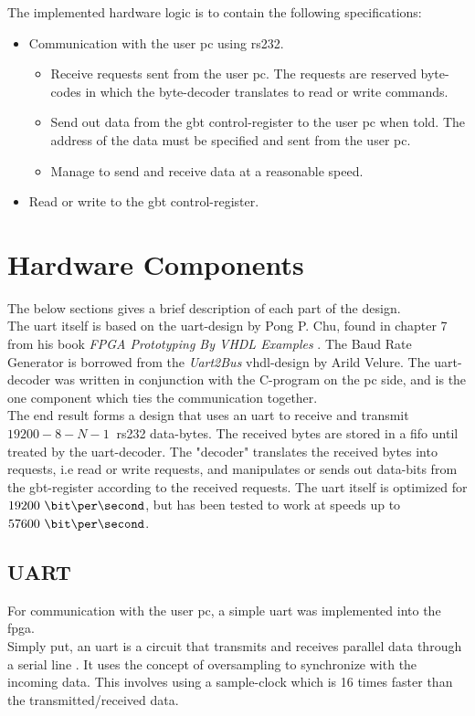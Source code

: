 \documentclass[main.tex]{subfiles}
\begin{document}
The implemented hardware logic is to contain the following specifications:\\
\begin{itemize} \setlength{\itemsep}{10pt}
\item Communication with the user \acrshort{pc} using \acrshort{rs232}.
  \begin{itemize}
  \item Receive requests sent from the user \acrshort{pc}. The requests are reserved byte-codes in which the byte-decoder translates to read or write commands. 
  \item Send out data from the \gls{gbt} control-register to the user \acrshort{pc} when told. The address of the data must be specified and sent from the user \acrshort{pc}.
  \item Manage to send and receive data at a reasonable speed. 
  \end{itemize}
\item Read or write to the \gls{gbt} control-register.
\end{itemize}

\section{Hardware Components}

The below sections gives a brief description of each part of the design.\\
The \gls{uart} itself is based on the \gls{uart}-design by Pong P. Chu, found in chapter 7 from his book \textit{FPGA Prototyping By VHDL Examples} \cite{chu08}. The Baud Rate Generator is borrowed from the \textit{Uart2Bus} \acrshort{vhdl}-design by Arild Velure. The \gls{uart}-decoder was written in conjunction with the C-program on the \acrshort{pc} side, and is the one component which ties the communication together.\\

The end result forms a design that uses an \gls{uart} to receive and transmit $19200-8-N-1~$ \acrshort{rs232} data-bytes. The received bytes are stored in a \gls{fifo} until treated by the \gls{uart}-decoder. The "decoder" translates the received bytes into requests, i.e read or write requests, and manipulates or sends out data-bits from the \gls{gbt}-register according to the received requests. The \gls{uart} itself is optimized for $19200~\bit\per\second$, but has been tested to work at speeds up to $57600~\bit\per\second$.

\subsection{UART}
For communication with the user \acrshort{pc}, a simple \gls{uart} was implemented into the \gls{fpga}.\\
Simply put, an \gls{uart} is a circuit that transmits and receives parallel data through a serial line \cite{chu08}. It uses the concept of oversampling to synchronize with the incoming data. This involves using a sample-clock which is 16 times faster than the transmitted/received data.\\
\end{document}
